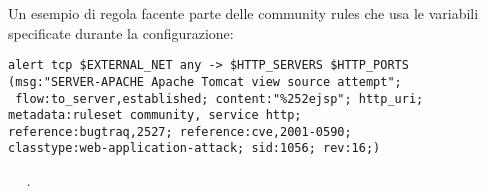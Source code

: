 Un esempio di regola facente parte delle community rules che usa le variabili specificate durante la configurazione:

\begin{verbatim}
alert tcp $EXTERNAL_NET any -> $HTTP_SERVERS $HTTP_PORTS 
(msg:"SERVER-APACHE Apache Tomcat view source attempt";
 flow:to_server,established; content:"%252ejsp"; http_uri;
metadata:ruleset community, service http; 
reference:bugtraq,2527; reference:cve,2001-0590;
classtype:web-application-attack; sid:1056; rev:16;)
\end{verbatim}

~\cite{FWSnort} ~\cite{techrepublic}.